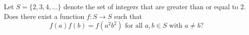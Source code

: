 Let $S = \{2, 3, 4, \ldots\}$ denote the set of integers that are greater than or equal to $2$. Does there exist a function $f : S \to S$ such that \[f (a)f (b) = f (a^2 b^2 )\text{ for all }a, b \in S\text{ with }a \ne b?\]